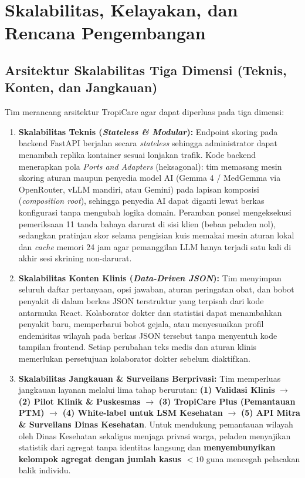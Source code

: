 
\section{Skalabilitas, Kelayakan, dan Rencana Pengembangan}

\subsection{Arsitektur Skalabilitas Tiga Dimensi (Teknis, Konten, dan Jangkauan)}

Tim merancang arsitektur TropiCare agar dapat diperluas pada tiga dimensi:

\begin{enumerate}
    \item \textbf{Skalabilitas Teknis (\textit{Stateless \& Modular}):} 
    Endpoint skoring pada backend FastAPI berjalan secara \textit{stateless} sehingga administrator dapat menambah replika kontainer sesuai lonjakan trafik. Kode backend menerapkan pola \textit{Ports and Adapters} (heksagonal): tim memasang mesin skoring aturan maupun penyedia model AI (Gemma 4 / MedGemma via OpenRouter, vLLM mandiri, atau Gemini) pada lapisan komposisi (\textit{composition root}), sehingga penyedia AI dapat diganti lewat berkas konfigurasi tanpa mengubah logika domain. Peramban ponsel mengeksekusi pemeriksaan 11 tanda bahaya darurat di sisi klien (beban peladen nol), sedangkan pratinjau skor selama pengisian kuis memakai mesin aturan lokal dan \textit{cache} memori 24 jam agar pemanggilan LLM hanya terjadi satu kali di akhir sesi skrining non-darurat.

    \item \textbf{Skalabilitas Konten Klinis (\textit{Data-Driven JSON}):} 
    Tim menyimpan seluruh daftar pertanyaan, opsi jawaban, aturan peringatan obat, dan bobot penyakit di dalam berkas JSON terstruktur yang terpisah dari kode antarmuka React. Kolaborator dokter dan statistisi dapat menambahkan penyakit baru, memperbarui bobot gejala, atau menyesuaikan profil endemisitas wilayah pada berkas JSON tersebut tanpa menyentuh kode tampilan frontend. Setiap perubahan teks medis dan aturan klinis memerlukan persetujuan kolaborator dokter sebelum diaktifkan.

    \item \textbf{Skalabilitas Jangkauan \& Surveilans Berprivasi:} 
    Tim memperluas jangkauan layanan melalui lima tahap berurutan: \textbf{(1) Validasi Klinis} $\rightarrow$ \textbf{(2) Pilot Klinik \& Puskesmas} $\rightarrow$ \textbf{(3) TropiCare Plus (Pemantauan PTM)} $\rightarrow$ \textbf{(4) White-label untuk LSM Kesehatan} $\rightarrow$ \textbf{(5) API Mitra \& Surveilans Dinas Kesehatan}. Untuk mendukung pemantauan wilayah oleh Dinas Kesehatan sekaligus menjaga privasi warga, peladen menyajikan statistik dari agregat tanpa identitas langsung dan \textbf{menyembunyikan kelompok agregat dengan jumlah kasus $<10$} guna mencegah pelacakan balik individu.
\end{enumerate}

